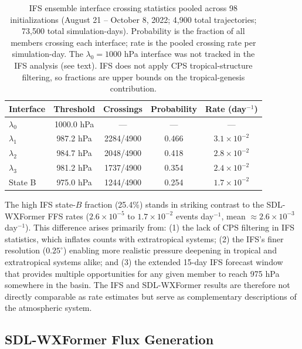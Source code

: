 \documentclass[11pt]{article}
\begin{document}
\begin{table}[htbp]
\centering
\caption{IFS ensemble interface crossing statistics pooled across 98 initializations (August 21 -- October 8, 2022; 4,900 total trajectories; 73,500 total simulation-days). Probability is the fraction of all members crossing each interface; rate is the pooled crossing rate per simulation-day. The $\lambda_0 = 1000$ hPa interface was not tracked in the IFS analysis (see text). IFS does not apply CPS tropical-structure filtering, so fractions are upper bounds on the tropical-genesis contribution.}
\label{tab:ifs_baseline}
\begin{tabular}{lcccc}
\toprule
Interface & Threshold & Crossings & Probability & Rate (day$^{-1}$) \\
\midrule
$\lambda_0$ & 1000.0 hPa & --- & --- & --- \\
$\lambda_1$ & 987.2 hPa & 2284/4900 & 0.466 & $3.1 \times 10^{-2}$ \\
$\lambda_2$ & 984.7 hPa & 2048/4900 & 0.418 & $2.8 \times 10^{-2}$ \\
$\lambda_3$ & 981.2 hPa & 1737/4900 & 0.354 & $2.4 \times 10^{-2}$ \\
State B     & 975.0 hPa & 1244/4900 & 0.254 & $1.7 \times 10^{-2}$ \\
\bottomrule
\end{tabular}
\end{table}

The high IFS state-$B$ fraction (25.4\%) stands in striking contrast to the SDL-WXFormer FFS rates ($2.6\times10^{-5}$ to $1.7\times10^{-2}$ events day$^{-1}$, mean $\approx 2.6\times10^{-3}$ day$^{-1}$). This difference arises primarily from: (1) the lack of CPS filtering in IFS statistics, which inflates counts with extratropical systems; (2) the IFS's finer resolution ($0.25^\circ$) enabling more realistic pressure deepening in tropical and extratropical systems alike; and (3) the extended 15-day IFS forecast window that provides multiple opportunities for any given member to reach 975 hPa somewhere in the basin. The IFS and SDL-WXFormer results are therefore not directly comparable as rate estimates but serve as complementary descriptions of the atmospheric system.


\subsection{SDL-WXFormer Flux Generation}
\label{sec:flux_results}
\end{document}
